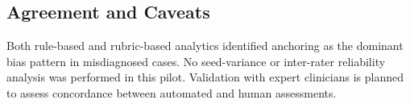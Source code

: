 \subsection{Agreement and Caveats}
Both rule-based and rubric-based analytics identified anchoring as the dominant bias
pattern in misdiagnosed cases. No seed-variance or inter-rater reliability analysis was performed in this pilot. Validation with expert clinicians is planned to assess concordance between automated and human assessments.
